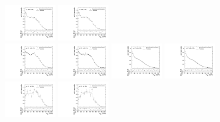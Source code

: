 \begin{figure}[htbp]
  \includegraphics[width=0.2\textwidth]{fig/analysis/templateVsReco_nonRes_r0_MJ_mu_LP_bb_HDy.pdf}
  \includegraphics[width=0.2\textwidth]{fig/analysis/templateVsReco_nonRes_r0_MJ_e_LP_bb_HDy.pdf}\\
  \includegraphics[width=0.2\textwidth]{fig/analysis/templateVsReco_nonRes_r0_MJ_mu_HP_nobb_HDy.pdf}
  \includegraphics[width=0.2\textwidth]{fig/analysis/templateVsReco_nonRes_r0_MJ_e_HP_nobb_HDy.pdf}
  \includegraphics[width=0.2\textwidth]{fig/analysis/templateVsReco_nonRes_r0_MJ_mu_LP_nobb_HDy.pdf}
  \includegraphics[width=0.2\textwidth]{fig/analysis/templateVsReco_nonRes_r0_MJ_e_LP_nobb_HDy.pdf}\\
  \includegraphics[width=0.2\textwidth]{fig/analysis/templateVsReco_nonRes_r0_MJ_mu_HP_vbf_HDy.pdf}
  \includegraphics[width=0.2\textwidth]{fig/analysis/templateVsReco_nonRes_r0_MJ_e_HP_vbf_HDy.pdf}

\end{figure}
